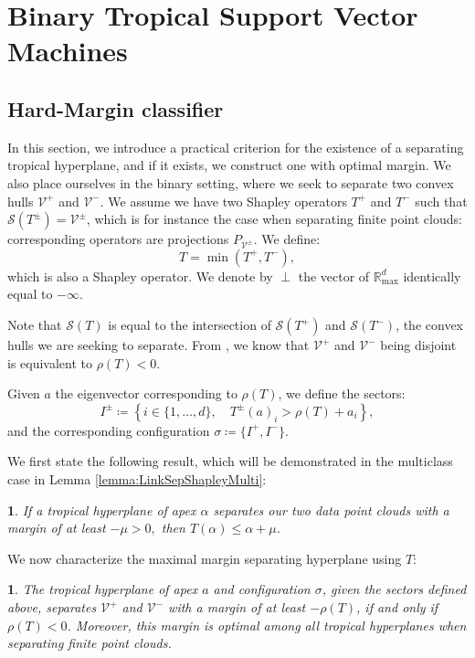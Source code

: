 \documentclass[oneside,UKenglish,a4paper]{amsart}
\numberwithin{equation}{section}
\numberwithin{figure}{section}
\theoremstyle{plain}
\theoremstyle{definition}
\theoremstyle{plain}
\newtheorem{prop}[thm]{\protect\propositionname}
\theoremstyle{remark}
\theoremstyle{plain}
\newtheorem{lem}[thm]{\protect\lemmaname}
\theoremstyle{definition}
\theoremstyle{definition}
\providecommand{\lemmaname}{Lemma}
\providecommand{\propositionname}{Proposition}
\begin{document}
\section{Binary Tropical Support Vector Machines}

\subsection{Hard-Margin classifier}
In this section, we introduce a practical criterion for the existence of a separating tropical hyperplane, and if it exists, we construct one with optimal margin. We also place ourselves in the binary setting, where we seek to separate two convex hulls $\mathcal{V}^{+}$
and $\mathcal{V}^{-}$. We assume we have two Shapley operators $T^{+}$
and $T^{-}$ such that $\mathcal{S}(T^{\pm})=\mathcal{V}^{\pm}$,
which is for instance the case when separating finite point clouds:
corresponding operators are projections $P_{\mathcal{V}^{\pm}}$. We define:
\[
T=\min(T^{+},T^{-}),
\]
which is also a Shapley operator. We denote by $\perp$ the vector of $\mathbb{R}_{\max}^{d}$
identically equal to $-\infty$. 
    
Note that $\mathcal{S}(T)$ is equal to the intersection of $\mathcal{S}(T^{+})$ and $\mathcal{S}(T^{-})$, the convex hulls we are seeking to separate.
From \cite{Allamigeon2018}, we know that $\mathcal{V}^{+}$
and $\mathcal{V^{-}}$ being disjoint is equivalent to $\rho(T)<0$.

Given $a$ the eigenvector corresponding to $\rho(T)$, we define the sectors:
\[
I^{\pm}\coloneqq\left\{i\in\{1,\ldots, d\},\quad T^{\pm}(a)_{i}>\rho(T)+a_{i}\right\},
\]
and the corresponding configuration $\sigma\coloneqq\{I^{+},I^{-}\}$.

We first state the following result, which will be demonstrated in the multiclass case in Lemma \ref{lemma:LinkSepShapleyMulti}:

\begin{lem}
\label{lemma:LinkSepShapleyBinary}
    If a tropical hyperplane of apex $\alpha$ separates our two data point clouds with a margin of at least $-\mu > 0,$ then $T(\alpha) \le \alpha  + \mu$.
\end{lem}

We now characterize the maximal margin separating hyperplane using $T$:

\begin{prop} \label{prop:BinaryHardMargin}
The tropical hyperplane of apex $a$ and configuration $\sigma$, given the sectors defined
above, separates $\mathcal{V}^{+}$ and $\mathcal{V}^{-}$ with a
margin of at least $-\rho(T)$, if and only if $\rho(T) < 0$. Moreover, this margin is \emph{optimal} among all  tropical hyperplanes when  separating finite point clouds.
\end{prop}
\end{document}

